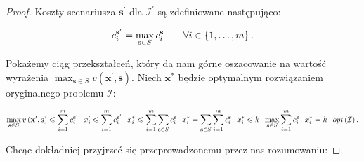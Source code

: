 \begin{proof}
	Koszty scenariusza $\textbf{s}^{\prime}$ dla $\mathcal{I}^{\prime}$ są zdefiniowane następująco:
	
	\begin{equation}
		c^{\textbf{s}^{\prime}}_{i} = \max_{\mathclap{\textbf{s} \in S}} c^{\textbf{s}}_{i} \qquad \forall i \in \left\{ 1, \dots, m \right\}\text{.}
	\end{equation}
	
	Pokażemy ciąg przekształceń, który da nam górne oszacowanie na wartość wyrażenia $ \max_{\textbf{s} \in S} v \left( \textbf{x}^{\prime}, \textbf{s} \right)$. Niech $\textbf{x}^{\ast}$ będzie optymalnym rozwiązaniem oryginalnego problemu $\mathcal{I}$:
	
	\begin{equation}
		\max_{\mathclap{\textbf{s} \in S}} v \left( \textbf{x}^{\prime}, \textbf{s} \right) \leqslant \sum_{\mathclap{i = 1}}^{m} c_{i}^{\textbf{s}^{\prime}} \cdot x_{i}^{\prime} \leqslant \sum_{\mathclap{i = 1}}^{m} c_{i}^{\textbf{s}^{\prime}} \cdot x_{i}^{\ast} \leqslant \sum_{\mathclap{i = 1}}^{m} \sum_{\mathclap{\textbf{s} \in S}} c_{i}^{\textbf{s}} \cdot x_{i}^{\ast} =  \sum_{\mathclap{\textbf{s} \in S}} \sum_{\mathclap{i = 1}}^{m} c_{i}^{\textbf{s}} \cdot x_{i}^{\ast} \leqslant k \cdot \max_{\mathclap{\textbf{s} \in S}} \sum_{\mathclap{i = 1}}^{m} c_{i}^{\textbf{s}} \cdot x_{i}^{\ast} = k \cdot opt \left( \mathcal{I} \right)\text{.}
	\end{equation}
	
	Chcąc dokładniej przyjrzeć się przeprowadzonemu przez nas rozumowaniu:
	

\end{proof}
